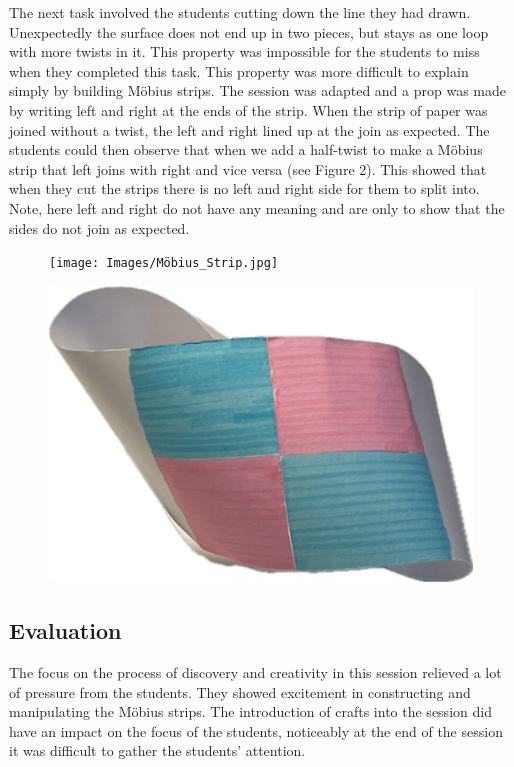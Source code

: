 \documentclass[11pt, a4paper, notitlepage]{article}
\begin{document}
\par
The next task involved the students cutting down the line they had drawn. Unexpectedly the surface does not end up in two pieces, but stays as one loop with more twists in it. This property was impossible for the students to miss when they completed this task. This property was more difficult to explain simply by building M\"obius strips. The session was adapted and a prop was made by writing left and right at the ends of the strip. When the strip of paper was joined without a twist, the left and right lined up at the join as expected. The students could then observe that when we add a half-twist to make a M\"obius strip that left joins with right and vice versa (see Figure 2). This showed that when they cut the strips there is no left and right side for them to split into. Note, here left and right do not have any meaning and are only to show that the sides do not join as expected. 

\begin{figure}[htbp]
    \centering
    \begin{minipage}{.48\textwidth}
      \centering
      \texttt{[image: Images/Möbius\_Strip.jpg]}
      \label{fig:test1}
    \end{minipage}%
    \hfill
    \begin{minipage}{.48\textwidth}
      \centering
      \includegraphics[height=.39\linewidth]{Images/coloured_mobius.png}
      \label{fig:test2}
    \end{minipage}
    \end{figure}


\subsection*{Evaluation}
The focus on the process of discovery and creativity in this session relieved a lot of pressure from the students. They showed excitement in constructing and manipulating the M\"obius strips. The introduction of crafts into the session did have an impact on the focus of the students, noticeably at the end of the session it was difficult to gather the students' attention.
\end{document}
